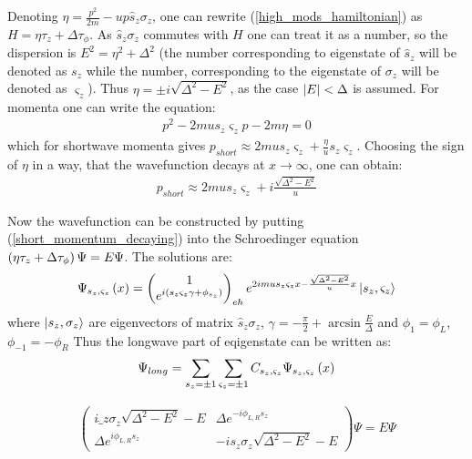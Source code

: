 Denoting $ \eta = \frac{p^2}{2m}-up\hat{s}_z\sigma_z $, one can rewrite (\ref{high_mods_hamiltonian}) as $ H=\eta\tau_z+\Delta\tau_\phi $. As $ \hat{s}_z\sigma_z $ commutes with $ H $ one can treat it as a number, so the dispersion is $ E^2 =\eta^2+\Delta^2 $ (the number corresponding to eigenstate of $ \hat{s}_z $ will be denoted as $ s_z $ while the number, corresponding to the eigenstate of $ \sigma_z $ will be denoted as $ \varsigma_z $). Thus $ \eta=\pm i\sqrt{\Delta^2-E^2} $, as the case $ \left|E\right|<\Delta $ is assumed. For momenta\textbf{} one can write the equation:
\begin{gather}
	p^2-2mu s_z \varsigma_z p - 2m \eta =0
\end{gather}
which for shortwave momenta gives $ p_{short}\approx2 mu s_z \varsigma_z + \frac{\eta}{u}s_z\varsigma_z$. Choosing the sign of $ \eta $ in a way, that the wavefunction decays at $ x\to \infty $, one can obtain:
\begin{gather}
\label{short_momentum_decaying}
	p_{short}\approx
	2 mu s_z \varsigma_z 
	+
	i\frac{\sqrt{\Delta^2-E^2}}{u}
\end{gather}


Now the wavefunction can be constructed by putting (\ref{short_momentum_decaying}) into the Schroedinger equation $ \left(\eta\tau_z +\Delta\tau_\phi\right)\Psi=E\Psi $. The solutions are:
\begin{gather}
	\Psi_{s_z,\varsigma_z}\left(x\right)
	=
	\begin{pmatrix}
	1
	\\
	e^{i\left(s_z\varsigma_z\gamma+\phi_{s_z}\right)}
	\end{pmatrix}_{eh}
	e^{2imus_z\varsigma_zx -\frac{\sqrt{\Delta^2-E^2}}{u}x}
	\ket{s_z, \varsigma_z}
\end{gather}
where  $ \ket{s_z, \sigma_z} $ are eigenvectors of matrix $ \hat{s}_z \sigma_z $,  $ \gamma = -\frac{\pi}{2}+\arcsin\frac{E}{\Delta} $ and $ \phi_{1}=\phi_L$, $ \phi_{-1}=-\phi_R $
Thus the longwave part of eqigenstate can be written as:
\begin{gather}
\label{fast_mode_expansion}
	\Psi_{long}
	=
	\sum_{s_z=\pm 1}
	\sum_{\varsigma_z=\pm 1}
	C_{s_z,\varsigma_z}
	\Psi_{s_z,\varsigma_z}\left(x\right)
\end{gather}
 
\begin{gather}
\begin{pmatrix}
i \hat_z \sigma_z\sqrt{\Delta^2-E^2}-E & \Delta e^{-i\phi_{L,R} s_z} \\
\Delta e^{i\phi_{L,R} s_z} & -i s_z \sigma_z\sqrt{\Delta^2-E^2}-E
\end{pmatrix}
\Psi
=
E\Psi
\end{gather}
\fi


